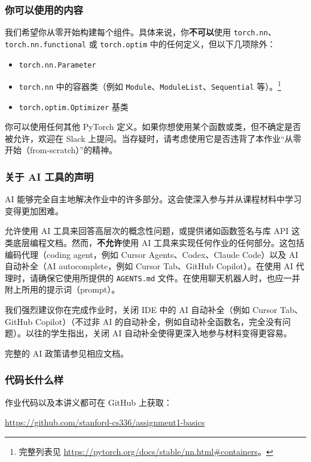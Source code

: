 \subsubsection*{你可以使用的内容}

我们希望你从零开始构建每个组件。具体来说，你\textbf{不可以}使用 \texttt{torch.nn}、\texttt{torch.nn.functional} 或 \texttt{torch.optim} 中的任何定义，但以下几项除外：

\begin{itemize}[leftmargin=2.2em]
  \item \texttt{torch.nn.Parameter}
  \item \texttt{torch.nn} 中的容器类（例如 \texttt{Module}、\texttt{ModuleList}、\texttt{Sequential} 等）。\footnote{完整列表见 \url{https://pytorch.org/docs/stable/nn.html\#containers}。}
  \item \texttt{torch.optim.Optimizer} 基类
\end{itemize}

你可以使用任何其他 PyTorch 定义。如果你想使用某个函数或类，但不确定是否被允许，欢迎在 Slack 上提问。当存疑时，请考虑使用它是否违背了本作业“从零开始（from-scratch）”的精神。

\subsubsection*{关于 AI 工具的声明}

AI 能够完全自主地解决作业中的许多部分。这会使深入参与并从课程材料中学习变得更加困难。

允许使用 AI 工具来回答高层次的概念性问题，或提供诸如函数签名与库 API 这类底层编程文档。然而，\textbf{不允许}使用 AI 工具来实现任何作业的任何部分。这包括编码代理（coding agent，例如 Cursor Agents、Codex、Claude Code）以及 AI 自动补全（AI autocomplete，例如 Cursor Tab、GitHub Copilot）。在使用 AI 代理时，请确保它使用所提供的 \texttt{AGENTS.md} 文件。在使用聊天机器人时，也应一并附上所用的提示词（prompt）。

我们强烈建议你在完成作业时，关闭 IDE 中的 AI 自动补全（例如 Cursor Tab、GitHub Copilot）（不过非 AI 的自动补全，例如自动补全函数名，完全没有问题）。以往的学生指出，关闭 AI 自动补全使得更深入地参与材料变得更容易。

完整的 AI 政策请参见相应文档。

\subsubsection*{代码长什么样}

作业代码以及本讲义都可在 GitHub 上获取：
\begin{center}
  \url{https://github.com/stanford-cs336/assignment1-basics}
\end{center}

